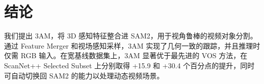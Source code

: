 \vspace{-0.5em}
\section{结论}
\vspace{-0.5em}
我们提出 3AM，将 3D 感知特征整合进 SAM2，用于视角鲁棒的视频对象分割。通过 Feature Merger 和视场感知采样，3AM 实现了几何一致的跟踪，并且推理时仅需 RGB 输入。在宽基线数据集上，3AM 显著优于最先进的 VOS 方法，在 ScanNet++ Selected Subset 上分别取得 +15.9 和 +30.4 个百分点的提升，同时可自动切换回 SAM2 的能力以处理动态视频场景。



